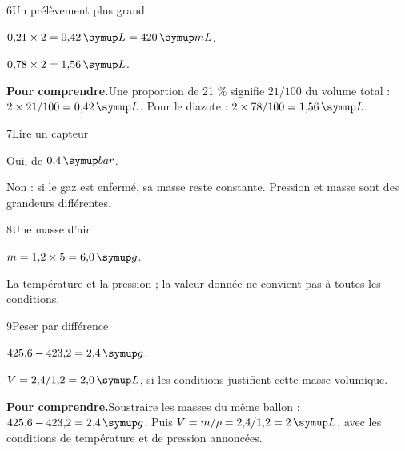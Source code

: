 \par\noindent\begin{minipage}{\linewidth}
\begin{corrige}{6}{Un prélèvement plus grand}
\begin{questions}
\item $0{,}21\times2=0{,}42\unite L=420\unite{mL}$.
\item $0{,}78\times2=1{,}56\unite L$.
\end{questions}
\par\smallskip\noindent\textbf{Pour comprendre.}\enspace Une proportion de 21 \% signifie $21/100$ du volume total : $2\times21/100=0{,}42\unite L$. Pour le diazote : $2\times78/100=1{,}56\unite L$.\par
\end{corrige}
\end{minipage}
\par\noindent\begin{minipage}{\linewidth}
\begin{corrige}{7}{Lire un capteur}
\begin{questions}
\item Oui, de $0{,}4\unite{bar}$.
\item Non : si le gaz est enfermé, sa masse reste constante. Pression et masse sont des grandeurs différentes.
\end{questions}
\end{corrige}
\end{minipage}
\par\noindent\begin{minipage}{\linewidth}
\begin{corrige}{8}{Une masse d’air}
\begin{questions}
\item $m=1{,}2\times5=6{,}0\unite g$.
\item La température et la pression ; la valeur donnée ne convient pas à toutes les conditions.
\end{questions}
\end{corrige}
\end{minipage}
\par\noindent\begin{minipage}{\linewidth}
\begin{corrige}{9}{Peser par différence}
\begin{questions}
\item $425{,}6-423{,}2=2{,}4\unite g$.
\item $V=2{,}4/1{,}2=2{,}0\unite L$, si les conditions justifient cette masse volumique.
\end{questions}
\par\smallskip\noindent\textbf{Pour comprendre.}\enspace Soustraire les masses du même ballon : $425{,}6-423{,}2=2{,}4\unite g$. Puis $V=m/\rho=2{,}4/1{,}2=2\unite L$, avec les conditions de température et de pression annoncées.\par
\end{corrige}
\end{minipage}
